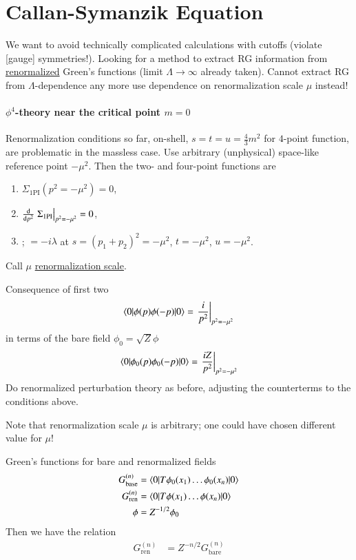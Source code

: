 
\section{Callan-Symanzik Equation}
We want to avoid technically complicated calculations with cutoffs (violate [gauge] symmetries!). Looking for a method to extract RG information from \underline{renormalized} Green's functions (limit $\Lambda \rightarrow \infty$ already taken). Cannot extract RG from $\Lambda$-dependence any more use dependence on renormalization scale $\mu$ instead!

\paragraph{$\phi^4$-theory near the critical point $m=0$}
Renormalization conditions so far, on-shell, $s=t=u=\frac{4}{3}m^2$ for $4$-point function, are problematic in the massless case. Use arbitrary (unphysical) space-like reference point $-\mu^2$. Then the two- and four-point functions are
\begin{enumerate}
   \item $\Sigma_{1\text{PI}}(p^2 = -\mu^2) = 0$,
   \item $\dv{p^2} \eval{\Sigma_{1\text{PI}}}_{p^2 = -\mu^2} = 0$,
   \item {}; $=-i\lambda$ at $s = (p_1+p_2)^2 = -\mu^2$, $t = -\mu^2$, $u=-\mu^2$.
\end{enumerate}
Call $\mu$ \underline{renormalization scale}.

Consequence of first two
\begin{align}
   \braket{0 | \phi(p) \phi(-p) | 0} = \eval{\frac{i}{p^2}}_{p^2 = -\mu^2} 
\end{align}
in terms of the bare field $\phi_0 = \sqrt{Z}\phi$
\begin{align}
   \braket{0 | \phi_0(p) \phi_0(-p) | 0} = \eval{\frac{iZ}{p^2}}_{p^2 = -\mu^2}
\end{align}
Do renormalized perturbation theory as before, adjusting the counterterms to the conditions above.

Note that renormalization scale $\mu$ is arbitrary; one could have chosen different value for $\mu$!

Green's functions for bare and renormalized fields
\begin{align*}
   G_{\text{base}}^{(n)} &= \braket{0 | T \phi_0 (x_1) \dots \phi_0(x_n) | 0 } \\
   G_{\text{ren}}^{(n)} &= \braket{0 | T \phi (x_1) \dots \phi(x_n) | 0 } \\
   \phi &= Z^{-1/2} \phi_0
\end{align*}
Then we have the relation
\begin{align}
   G_\text{ren}^{(n)} &= Z^{-n/2} G_\text{bare}^{(n)}
\end{align}

